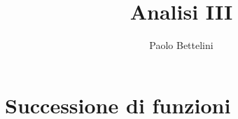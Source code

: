 \documentclass[a4paper]{article}
\title{Analisi III}
\author{Paolo Bettelini}
\date{}
\begin{document}
\maketitle
\tableofcontents

\section{Successione di funzioni}

%
%
%
%
%
%
%
%
%
\end{document}
